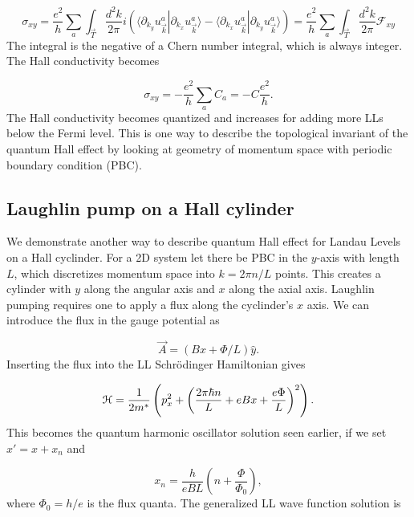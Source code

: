 \begin{equation}
  \sigma_{xy} = \dfrac{e^2}{h} \sum_{a} \int_{\vec{T}} \dfrac{d^2k}{2\pi} i\left(\langle \partial_{k_y} u_{\vec{k}}^a | \partial_{k_x} u_{\vec{k}}^a \rangle - \langle \partial_{k_x} u_{\vec{k}}^a | \partial_{k_y} u_{\vec{k}}^a \rangle \right) = \dfrac{e^2}{h} \sum_{a} \int_{\vec{T}} \dfrac{d^2k}{2\pi} \mathcal{F}_{xy}
\end{equation}
The integral is the negative of a Chern number integral, which is always integer.
The Hall conductivity becomes

\begin{equation}
  \sigma_{xy} = -\dfrac{e^2}{h} \sum_a C_a = -C \dfrac{e^2}{h}.
\end{equation}
The Hall conductivity becomes quantized and increases for adding more LLs below the Fermi level.
This is one way to describe the topological invariant of the quantum Hall effect by looking at geometry of momentum space with periodic boundary condition (PBC).

\subsection{Laughlin pump on a Hall cylinder}
We demonstrate another way to describe quantum Hall effect for Landau Levels on a Hall cyclinder.
For a 2D system let there be PBC in the $y$-axis with length $L$, which discretizes momentum space into $k = 2\pi n/ L$ points.
This creates a cylinder with $y$ along the angular axis and $x$ along the axial axis.
Laughlin pumping requires one to apply a flux along the cyclinder's $x$ axis.
We can introduce the flux in the gauge potential as

\begin{equation}
  \vec{A} = (Bx + \Phi/L)\hat{y}.
\end{equation}
Inserting the flux into the LL Schr\"{o}dinger Hamiltonian gives

\begin{equation}
  \mathcal{H} = \dfrac{1}{2m^*} \left( p_x^2 + {\left(\dfrac{2\pi \hbar n}{L} + eBx + \dfrac{e\Phi}{L} \right)}^2\right).
\end{equation}
This becomes the quantum harmonic oscillator solution seen earlier, if we set $x' = x + x_n$ and

\begin{equation} \label{eq:xCM}
  x_n = \dfrac{h}{eBL} \left(n + \dfrac{\Phi}{\Phi_0} \right),
\end{equation}
where $\Phi_0 = h/e$ is the flux quanta.
The generalized LL wave function solution is

